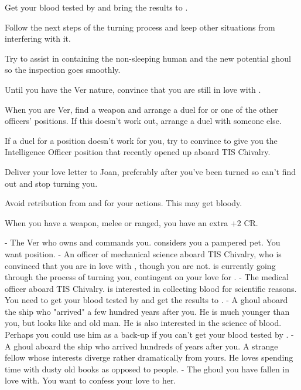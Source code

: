 \documentclass[char]{guildcamp4}
\begin{document}
\begin{itemz}[Goals]
	\item Get your blood tested by \cVthree{} and bring the results to \cVtwo{}.
	\item Follow the next steps of the turning process and keep other situations from interfering with it.
	\item Try to assist in containing the non-sleeping human and the new potential ghoul so the inspection goes smoothly.
	\item Until you have the Ver nature, convince \cVtwo{} that you are still in love with \cVtwo{\them}.
	\item When you are Ver, find a weapon and arrange a duel for \cVone{} or one of the other officers' positions. If this doesn't work out, arrange a duel with someone else.
	\item If a duel for a position doesn't work for you, try to convince \cVone{} to give you the Intelligence Officer position that recently opened up aboard TIS Chivalry.
	\item Deliver your love letter to Joan, preferably after you've been turned so \cVtwo{} can't find out and stop turning you.
	\item Avoid retribution from \cVone{} and \cVtwo{} for your actions. This may get bloody.
\end{itemz} 

\begin{itemz}[Notes]
	\item When you have a weapon, melee or ranged, you have an extra +2 CR.
\end{itemz}

\begin{contacts}
	\contact{\cVone{}} - The Ver who owns and commands you. \cVone{\they} considers you a pampered pet. You want \cVone{\their} position.
	\contact{\cVtwo{}} - An officer of mechanical science aboard TIS Chivalry, who is convinced that you are in love with \cVtwo{\them}, though you are not. \cVtwo{} is currently going through the process of turning you, contingent on your love for \cVtwo{\them}.
	\contact{\cVthree{}} - The medical officer aboard TIS Chivalry. \cVthree{\They} is interested in collecting blood for scientific reasons. You need to get your blood tested by \cVthree{\them} and get the results to \cVtwo{}.
	\contact{\cJames{}} - A ghoul aboard the ship who "arrived" a few hundred years after you. He is much younger than you, but looks like and old man. He is also interested in the science of blood. Perhaps you could use him as a back-up if you can't get your blood tested by \cVthree{}.
	\contact{\cRasputin{}} - A ghoul aboard the ship who arrived hundreds of years after you. A strange fellow whose interests diverge rather dramatically from yours. He loves spending time with dusty old books as opposed to people.
	\contact{\cJoan{}} - The ghoul you have fallen in love with. You want to confess your love to her. 
\end{contacts}
\end{document}
